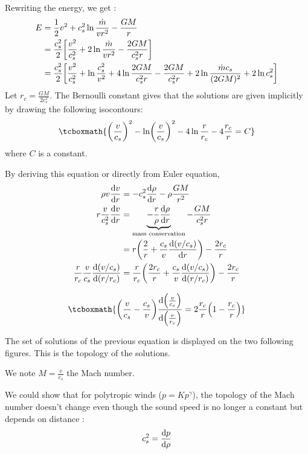 \documentclass[10pt,a4paper,english]{article}
\let\originalleft\left
\let\originalright\right
\renewcommand{\left}{\mathopen{}\mathclose\bgroup\originalleft}
\renewcommand{\right}{\aftergroup\egroup\originalright}
\begin{document}
Rewriting the energy, we get :
\begin{align}
  E &= \frac{1}{2}v^2 + c_s^2 \ln \frac{\dot{m}}{vr^2} - \frac{GM}{r} \\
    &= \frac{c_s^2}{2}\left[ \frac{v^2}{c_s^2} + 2\ln \frac{\dot{m}}{vr^2} - \frac{2GM}{c_s^2r}\right] \\
    &= \frac{c_s^2}{2} \left[\frac{v^2}{c_s^2} + \ln \frac{c_s^2}{v^2} + 4\ln \frac{2GM}{c_s^2r} - \frac{2GM}{c_s^2r} + 2\ln \frac{\dot{m}c_s}{(2GM)^2} + 2\ln c_s^2\right]
\end{align}
Let $r_c = \frac{GM}{2c_s^2}$. The Bernoulli constant gives that the
solutions are given implicitly by drawing the following isocontours:
\begin{equation}
  \tcboxmath{
    \left( \frac{v}{c_s} \right)^2 - \ln \left( \frac{v}{c_s} \right)^2 - 4\ln \frac{r}{r_c} - 4 \frac{r_c }{r} = C
  }
\end{equation}
where $C$ is a constant.

By deriving this equation or directly from Euler equation,
\begin{align}
  \rho v \frac{\d v}{\d r}  &= -c_s^2 \frac{\d \rho}{\d r} - \rho \frac{GM}{r^2} \\
  r \frac{v}{c_s^2} \frac{\d v}{\d r} &= \underbrace{-\frac{r}{\rho}\frac{\d \rho}{\d r}}_\textrm{mass conservation} - \frac{GM}{c_s^2r} \\
                            &= r \left( \frac{2}{r} + \frac{c_s}{v} \frac{\d(v/c_s)}{\d r} \right) - \frac{2r_c }{r} \\
  \frac{r}{r_c }\frac{v}{c_s }\frac{\d (v/c_s)}{\d (r/r_c)} & = \frac{r}{r_c} \left( \frac{2r_c }{r} + \frac{c_s}{v} \frac{\d(v/c_s)}{\d(r/r_c )} \right) - \frac{2r_c }{r}
\end{align}

\begin{equation}
  \label{eq:speed_eq}
  \tcboxmath{
    \left( \frac{v}{c_s} - \frac{c_s}{v} \right) \frac{\d \left( \frac{v}{c_s} \right) }{\d \left( \frac{r}{r_c } \right) } = 2 \frac{r_c}{r} \left( 1 - \frac{r_c }{r} \right)
  }
\end{equation}

The set of solutions of the previous equation is displayed on the two
following figures. This is the topology of the solutions.

We note $M = \frac{v}{c_s}$ the Mach number.

We could show that for polytropic winds ($p = Kp^\gamma$), the
topology of the Mach number doesn't change even though the sound speed
is no longer a constant but depends on distance :
\begin{equation}
  c_s^2 = \frac{\mathrm{d} p}{\mathrm{d} \rho}
\end{equation}
\end{document}
